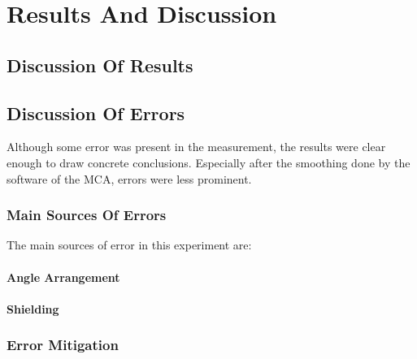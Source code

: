 \section{Results And Discussion}

	\subsection{Discussion Of Results}
	
	\subsection{Discussion Of Errors}
		Although some error was present in the measurement, the results were clear enough to draw concrete conclusions. Especially after the smoothing done by the software of the MCA, errors were less prominent.
	
		\subsubsection{Main Sources Of Errors}
			The main sources of error in this experiment are:
				\paragraph{Angle Arrangement}
				
				\paragraph{Shielding}
		
		\subsubsection{Error Mitigation}